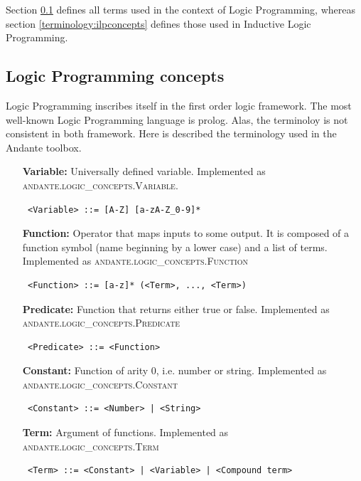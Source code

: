 \documentclass{article}
\begin{document}
Section \ref{terminology:lpconcepts} defines all terms used in the context
of Logic Programming, whereas section \ref{terminology:ilpconcepts} defines 
those used in Inductive Logic Programming.

\subsection{Logic Programming concepts} \label{terminology:lpconcepts}

Logic Programming inscribes itself in the first order logic framework. The most
well-known Logic Programming language is prolog. Alas, the terminoloy is not 
consistent in both framework. Here is described the terminology used in the 
Andante toolbox.

\begin{itemize}
    \item[\textbf{Variable:}] Universally defined variable. Implemented as
        \textsc{andante.logic\_concepts.Variable}.
        \begin{verbatim} <Variable> ::= [A-Z] [a-zA-Z_0-9]* \end{verbatim}

    \item[\textbf{Function:}] Operator that maps inputs to some output. It is
        composed of a function symbol (name beginning by a lower case) and a
        list of terms. Implemented as \textsc{andante.logic\_concepts.Function} 
        \begin{verbatim} <Function> ::= [a-z]* (<Term>, ..., <Term>) \end{verbatim}
        
    \item[\textbf{Predicate:}] Function that returns either true or false.
        Implemented as \textsc{andante.logic\_concepts.Predicate} 
        \begin{verbatim} <Predicate> ::= <Function> \end{verbatim}

    \item[\textbf{Constant:}] Function of arity 0, i.e. number or string.
        Implemented as \textsc{andante.logic\_concepts.Constant} 
        \begin{verbatim} <Constant> ::= <Number> | <String> \end{verbatim}

    \item[\textbf{Term:}] Argument of functions. Implemented as
        \textsc{andante.logic\_concepts.Term} 
        \begin{verbatim} <Term> ::= <Constant> | <Variable> | <Compound term> \end{verbatim}


\end{itemize}
\end{document}
